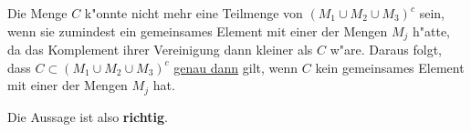 \documentclass[10pt, a4paper, oneside]{article}
\begin{document}
\begin{enumerate}[(a)]
        Die Menge $C$ k"onnte nicht mehr eine Teilmenge von $(M_1 \cup M_2 \cup
        M_3)^c$ sein, wenn sie zumindest ein gemeinsames Element mit einer der
        Mengen $M_j$ h"atte, da das Komplement ihrer Vereinigung dann kleiner
        als $C$ w"are. Daraus folgt, dass $C \subset (M_1 \cup M_2 \cup M_3)^c$
        \underline{genau dann} gilt, wenn $C$ kein gemeinsames Element mit
        einer der Mengen $M_j$ hat.

        Die Aussage ist also \textbf{richtig}.
\end{enumerate}
\end{document}
